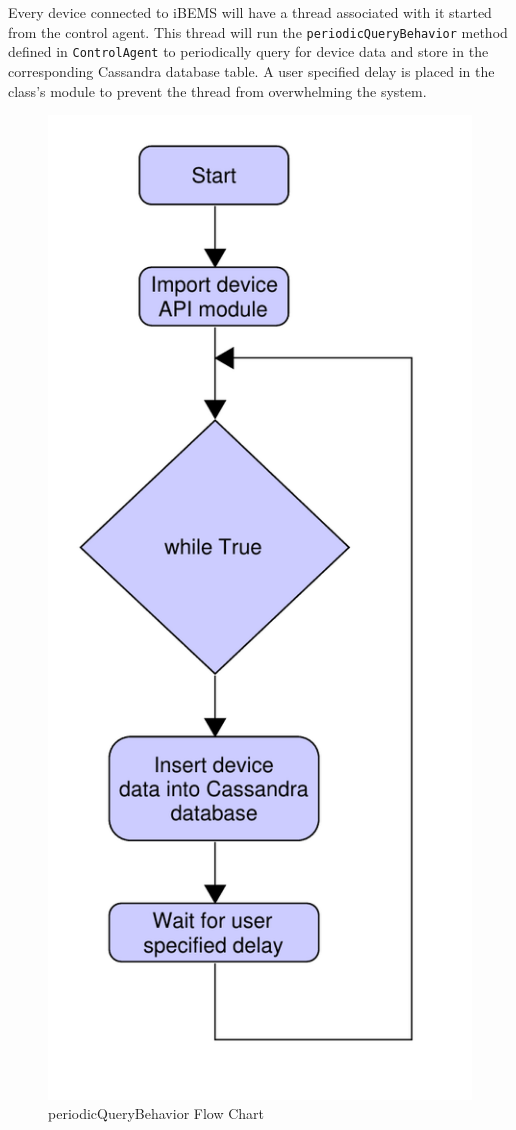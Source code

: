 \documentclass[conference]{IEEEtran}
\begin{document}
Every device connected to iBEMS will have a thread associated with it started from the control agent. This thread will run the \texttt{periodicQueryBehavior} method defined in \texttt{ControlAgent} to periodically query for device data and store in the corresponding Cassandra database table. A user specified delay is placed in the class's module to prevent the thread from overwhelming the system.

\begin{figure}[htbp]
    \centering
    \includegraphics[scale=0.3]{figs/agents/periodicQueryBehavior.pdf}
    \caption{periodicQueryBehavior Flow Chart}
    \label{fig:periodicQueryBehavior}
\end{figure}
\end{document}
